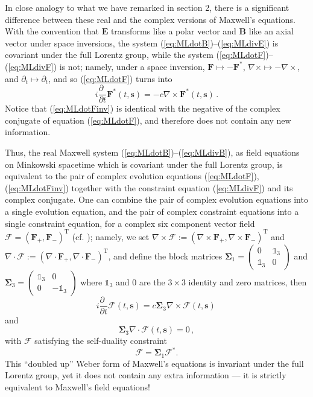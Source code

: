 \documentclass[11pt]{article}
\theoremstyle{definition}
\newcommand{\pddt}{\frac{\partial\phantom{t}}{\partial t}}
\newcommand{\refeq}[1]{(\ref{#1})}
\newcommand{\vect}[1] {\boldsymbol{{ #1}} }
\newcommand{\sV}{{\vect{s}}}            %
\newcommand{\FV}{\pmb{\mathcal{F}}}
\numberwithin{equation}{section}
\newcommand{\bB}{\mathbf{B}}
\newcommand{\bE}{\mathbf{E}}
\newcommand{\bF}{\mathbf{F}}
\newcommand{\beq}{\begin{equation}}
\newcommand{\eeq}{\end{equation}}
\newcommand{\p}{\partial}
\newcommand{\nab}{\nabla}
\begin{document}
 In close analogy to what we have remarked in section 2, there is a significant difference between these real and the
complex versions of Maxwell's equations. 
 With the convention that $\bE$ transforms like a polar vector and $\bB$ like an axial vector under space inversions, 
the system \refeq{eq:MLdotB}--\refeq{eq:MLdivE} is covariant under the full Lorentz group, while the system 
\refeq{eq:MLdotF}--\refeq{eq:MLdivF} is not; namely, under a space inversion,
$\bF\mapsto -\bF^\ast$, $\nab\times \mapsto -\nab\times$, and $\p_t\mapsto\p_t$, and so \refeq{eq:MLdotF} turns into 
\begin{equation}
 i \textstyle{\pddt}{\bF}^\ast(t,\sV)
= \label{eq:MLdotFinv}
       -  c\nab\times{\bF}^\ast(t,\sV) \, .
\end{equation}
 Notice that \refeq{eq:MLdotFinv} is identical with the negative of the complex conjugate of equation \refeq{eq:MLdotF}, and
therefore does not contain any new information.

 Thus, the real Maxwell system \refeq{eq:MLdotB}--\refeq{eq:MLdivB}, as field equations on Minkowski spacetime
which is covariant under the full Lorentz group, is equivalent to the pair of complex evolution equations 
\refeq{eq:MLdotF}, \refeq{eq:MLdotFinv} together with the constraint equation \refeq{eq:MLdivF} and its complex conjugate. 
 One can combine the pair of complex evolution equations into a single evolution equation,
and the pair of complex constraint equations into a single constraint equation, for a complex six component vector field
$\FV  = (\bF_+ ,\bF_-)^{\mathrm{T}}$ (cf. \cite{IBBphotonREV}); namely, we set $\nab\times\FV  := (\nab\times\bF_+ ,\nab\times\bF_-)^{\mathrm{T}}$ and 
$\nab\cdot\FV  := (\nab\cdot\bF_+ ,\nab\cdot\bF_-)^{\mathrm{T}}$, and define the block matrices
${\boldsymbol\Sigma}_1 = \begin{pmatrix} 0 & \mathds{1}_3 \\ \mathds{1}_3 & 0 \end{pmatrix}$ and 
${\boldsymbol\Sigma}_3 = \begin{pmatrix} \mathds{1}_3 & 0 \\ 0 & -\mathds{1}_3 \end{pmatrix}$ 
where $\mathds{1}_3$ and $0$ are the $3\times 3$ identity and zero matrices, then 
\begin{equation}
 i \textstyle{\pddt}{\FV}(t,\sV)
= \label{eq:MLdotFFstar}
         c {\boldsymbol\Sigma}_3 \nab\times{\FV}(t,\sV) \, 
\end{equation}
and
\begin{equation}
\textstyle
        {\boldsymbol\Sigma}_3 \nab\cdot {\FV}(t,\sV)  
= \label{eq:MLdivFFstar}
        0\, ,
\end{equation}
with $\FV$ satisfying the self-duality constraint
\beq 
\FV = {\boldsymbol\Sigma}_1 \FV^\ast.
\eeq
 This ``doubled up'' Weber form of Maxwell's equations is invariant under the full Lorentz group, yet
it does not contain any extra information --- it is strictly equivalent to Maxwell's field equations!
\end{document}

